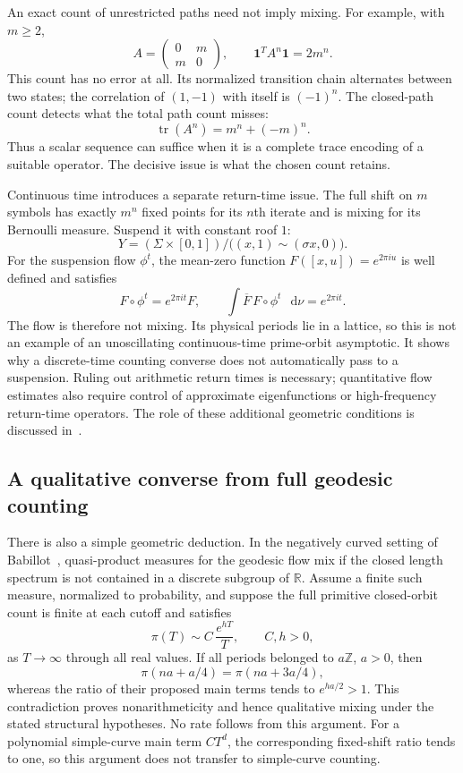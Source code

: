 \documentclass[11pt,a4paper]{article}
\numberwithin{equation}{section}
\theoremstyle{definition}
\theoremstyle{remark}
\DeclareMathOperator{\tr}{tr}
\newcommand{\dd}{\mathop{}\!\mathrm d}
\newcommand{\RR}{\mathbb R}
\newcommand{\ZZ}{\mathbb Z}
\begin{document}
An exact count of unrestricted paths need not imply mixing.
For example, with $m\geq2$,
\[
 A=\begin{pmatrix}0&m\\m&0\end{pmatrix},
 \qquad \mathbf1^T A^n\mathbf1=2m^n.
\]
This count has no error at all. Its normalized transition chain
alternates between two states; the correlation of $(1,-1)$ with
itself is $(-1)^n$. The closed-path count detects what the total
path count misses:
\[
 \tr(A^n)=m^n+(-m)^n.
\]
Thus a scalar sequence can suffice when it is a complete trace
encoding of a suitable operator. The decisive issue is what the
chosen count retains.

Continuous time introduces a separate return-time issue. The full
shift on $m$ symbols has exactly $m^n$ fixed points for its $n$th
iterate and is mixing for its Bernoulli measure. Suspend it with
constant roof $1$:
\[
 Y=(\Sigma\times[0,1])/
       \bigl((x,1)\sim(\sigma x,0)\bigr).
\]
For the suspension flow $\phi^t$, the mean-zero function
$F([x,u])=e^{2\pi i u}$ is well defined and satisfies
\[
 F\circ\phi^t=e^{2\pi it}F,\qquad
 \int\overline F\,F\circ\phi^t\,\dd\nu=e^{2\pi it}.
\]
The flow is therefore not mixing. Its physical periods lie in a
lattice, so this is not an example of an unoscillating continuous-time
prime-orbit asymptotic. It shows why a discrete-time counting converse
does not automatically pass to a suspension. Ruling out arithmetic
return times is necessary; quantitative flow estimates also require
control of approximate eigenfunctions or high-frequency return-time
operators. The role of these additional geometric conditions is
discussed in~\cite{DolgopyatMixing}.

\subsection{A qualitative converse from full geodesic counting}

There is also a simple geometric deduction. In the negatively curved
setting of Babillot~\cite[Theorem 1]{BabillotMixing}, quasi-product
measures for the geodesic flow mix if the closed length spectrum
is not contained in a discrete subgroup of $\RR$. Assume a finite
such measure, normalized to probability, and suppose the full
primitive closed-orbit count is finite at each cutoff and satisfies
\[
 \pi(T)\sim C\,\frac{e^{hT}}{T},\qquad C,h>0,
\]
as $T\longrightarrow\infty$ through all real values. If all periods
belonged to $a\ZZ$, $a>0$, then
\[
 \pi(na+a/4)=\pi(na+3a/4),
\]
whereas the ratio of their proposed main terms tends to $e^{ha/2}>1$.
This contradiction proves nonarithmeticity and hence qualitative
mixing under the stated structural hypotheses. No rate follows from
this argument. For a polynomial simple-curve main term $CT^d$,
the corresponding fixed-shift ratio tends to one, so this argument
does not transfer to simple-curve counting.
\end{document}
